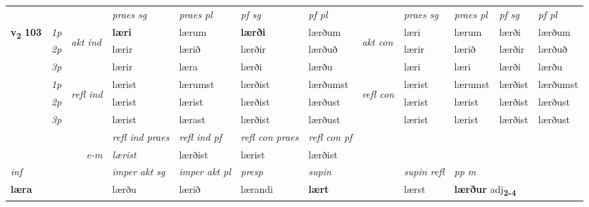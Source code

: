 \begin{longtable}[l]{X>{\footnotesize\itshape}llXXXXlXXXX}
 & &   & \textit{praes sg}  & \textit{praes pl}    & \textit{ pf sg} & \textit{pf pl} & & \textit{praes sg}  & \textit{praes pl}    & \textit{pf sg} & \textit{pf pl }  \\ \cmidrule{4-7} \cmidrule{9-12}
 \multirow{2}{*}{{{\textbf{v{\textsubscript{2}}} \Large{\textbf{103}}}}}  & 1p & \multirow{3}{*}{\begin{turn}{90}\textit{akt ind}\end{turn}} & \textbf{læri} & lærum & \textbf{lærði} & lærðum & \multirow{3}{*}{\begin{turn}{90}\textit{akt con}\end{turn}} &læri & lærum & lærði & lærðum\\*
 & 2p &  &  lærir  & lærið & lærðir & lærðuð & & lærir & lærið & lærðir & lærðuð \\*
 & 3p &  & lærir & læra & lærði & lærðu & & læri & læri& lærði & lærðu \\*
\cmidrule{4-7} \cmidrule{9-12}
 & 1p & \multirow{3}{*}{\begin{turn}{90}\textit{refl ind}\end{turn}}  & lærist & lærumst & lærðist & lærðumst & \multirow{3}{*}{\begin{turn}{90}\textit{refl con}\end{turn}}  &lærist & lærumst & lærðist & lærðumst \\*
 & 2p &  & lærist & lærist & lærðist & lærðust & &lærist & lærist & lærðist & lærðust \\*
 & 3p  & & lærist & lærast & lærðist & lærðust & & lærist & lærist& lærðist & lærðust \\*
\cmidrule{4-7} \cmidrule{9-12}

 & && \textit{refl ind praes} & \textit{refl ind pf} & \textit{refl con praes} & \textit{refl con pf} \\*
\multicolumn{3}{r}{\textit{e-m}}& lærist & lærðist & lærist & lærðist \\*

\cmidrule{4-7}
   {\textit{inf}} & &  & \textit{imper akt sg} & \textit{imper akt pl}   & \textit{presp} & \textit{supin} && \textit{supin refl} & \textit{pp m} \\*
  {\textbf{læra}} & && lærðu  & lærið   & lærandi &  \textbf{lært} && lærst & \multicolumn{2}{l}{\textbf{lærður} adj\textbf{\textsubscript{2-4}}} \\*

\midrule


\end{longtable}
